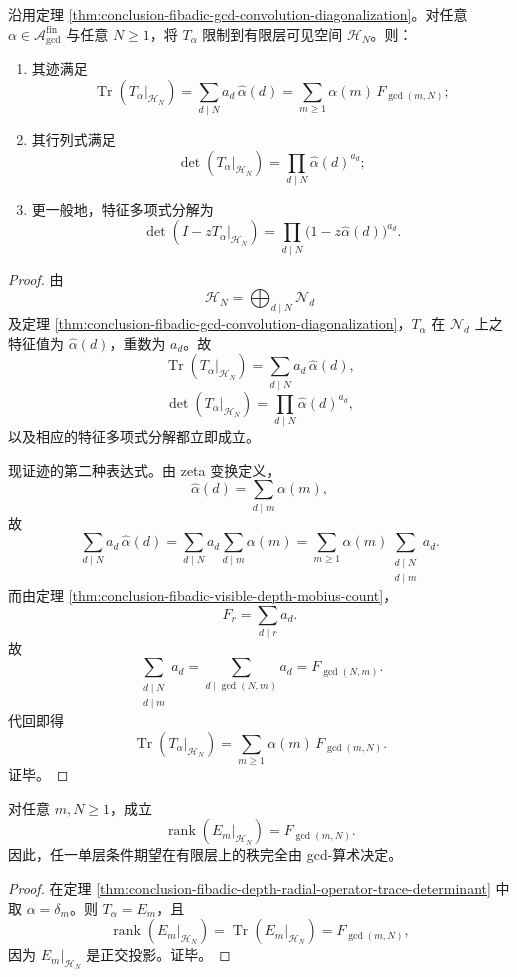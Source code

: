 \begin{theorem}[深度径向算子的迹与行列式显式公式]\label{thm:conclusion-fibadic-depth-radial-operator-trace-determinant}
沿用定理 \ref{thm:conclusion-fibadic-gcd-convolution-diagonalization}。对任意 \(\alpha\in\mathscr A_{\gcd}^{\mathrm{fin}}\) 与任意 \(N\ge 1\)，将 \(T_\alpha\) 限制到有限层可见空间 \(\mathcal H_N\)。则：
\begin{enumerate}
  \item 其迹满足
  \[
  \operatorname{Tr}(T_\alpha|_{\mathcal H_N})
  =
  \sum_{d\mid N}a_d\,\widehat{\alpha}(d)
  =
  \sum_{m\ge 1}\alpha(m)\,F_{\gcd(m,N)};
  \]
  \item 其行列式满足
  \[
  \det(T_\alpha|_{\mathcal H_N})
  =
  \prod_{d\mid N}\widehat{\alpha}(d)^{a_d};
  \]
  \item 更一般地，特征多项式分解为
  \[
  \det(I-zT_\alpha|_{\mathcal H_N})
  =
  \prod_{d\mid N}\bigl(1-z\widehat{\alpha}(d)\bigr)^{a_d}.
  \]
\end{enumerate}
\end{theorem}
\begin{proof}
由
\[
\mathcal H_N=\bigoplus_{d\mid N}\mathcal N_d
\]
及定理 \ref{thm:conclusion-fibadic-gcd-convolution-diagonalization}，\(T_\alpha\) 在 \(\mathcal N_d\) 上之特征值为 \(\widehat{\alpha}(d)\)，重数为 \(a_d\)。故
\[
\operatorname{Tr}(T_\alpha|_{\mathcal H_N})
=
\sum_{d\mid N}a_d\,\widehat{\alpha}(d),
\]
\[
\det(T_\alpha|_{\mathcal H_N})
=
\prod_{d\mid N}\widehat{\alpha}(d)^{a_d},
\]
以及相应的特征多项式分解都立即成立。

现证迹的第二种表达式。由 zeta 变换定义，
\[
\widehat{\alpha}(d)=\sum_{d\mid m}\alpha(m),
\]
故
\[
\sum_{d\mid N}a_d\,\widehat{\alpha}(d)
=
\sum_{d\mid N}a_d\sum_{d\mid m}\alpha(m)
=
\sum_{m\ge 1}\alpha(m)\sum_{\substack{d\mid N\\ d\mid m}}a_d.
\]
而由定理 \ref{thm:conclusion-fibadic-visible-depth-mobius-count}，
\[
F_r=\sum_{d\mid r}a_d.
\]
故
\[
\sum_{\substack{d\mid N\\ d\mid m}}a_d
=
\sum_{d\mid \gcd(N,m)}a_d
=
F_{\gcd(N,m)}.
\]
代回即得
\[
\operatorname{Tr}(T_\alpha|_{\mathcal H_N})
=
\sum_{m\ge 1}\alpha(m)\,F_{\gcd(m,N)}.
\]
证毕。
\end{proof}

\begin{corollary}\label{cor:conclusion-fibadic-single-depth-projection-rank-gcd}
对任意 \(m,N\ge 1\)，成立
\[
\operatorname{rank}(E_m|_{\mathcal H_N})=F_{\gcd(m,N)}.
\]
因此，任一单层条件期望在有限层上的秩完全由 gcd-算术决定。
\end{corollary}
\begin{proof}
在定理 \ref{thm:conclusion-fibadic-depth-radial-operator-trace-determinant} 中取 \(\alpha=\delta_m\)。则 \(T_\alpha=E_m\)，且
\[
\operatorname{rank}(E_m|_{\mathcal H_N})
=
\operatorname{Tr}(E_m|_{\mathcal H_N})
=
F_{\gcd(m,N)},
\]
因为 \(E_m|_{\mathcal H_N}\) 是正交投影。证毕。
\end{proof}

